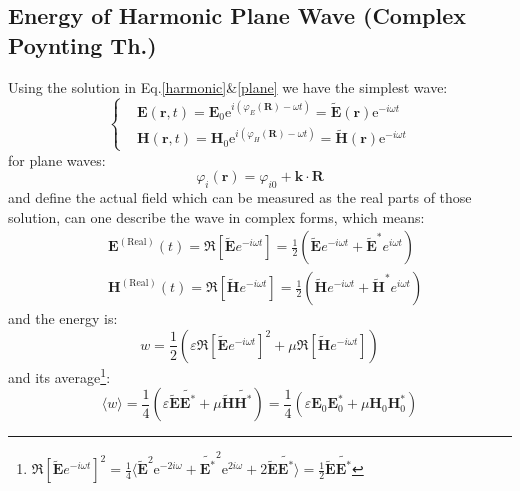\documentclass[11pt,a4paper,oneside]{book}
\begin{document}
\subsection{Energy of Harmonic Plane Wave (Complex Poynting Th.)}
Using the solution in Eq.\ref{harmonic}\&\ref{plane} we have the simplest wave:
\begin{equation}
	\left\{\begin{aligned}
		&\mathbf{E}(\mathbf{r},t)=\mathbf{E}_0\text{e}^{i(\varphi_E(\mathbf{R})-\omega t)}=\tilde{\mathbf{E}}(\mathbf{r})\text{e}^{-i\omega t} \\
		&\mathbf{H}(\mathbf{r},t)=\mathbf{H}_0\text{e}^{i(\varphi_H(\mathbf{R})-\omega t)}=\tilde{\mathbf{H}}(\mathbf{r})\text{e}^{-i\omega t} 
	\end{aligned}\right.
\end{equation}
for plane waves:\begin{equation}
	\varphi_i(\mathbf{r})=\varphi_{i0}+\mathbf{k}\cdot\mathbf{R}
\end{equation}
and define the actual field which can be measured as the real parts of those solution, can one describe the wave in complex forms, which means:\begin{equation}
	\begin{aligned}
		&\mathbf{E}^{(\text{Real})}(t) = \Re\left[\mathbf{\tilde{E}} e^{-i\omega t}\right] = \frac{1}{2} \left( \mathbf{\tilde{E}} e^{-i\omega t} + \mathbf{\tilde{E}}^* e^{i\omega t} \right)\\
		&\mathbf{H}^{(\text{Real})}(t) = \Re\left[\mathbf{\tilde{H}} e^{-i\omega t}\right] = \frac{1}{2} \left( \mathbf{\tilde{H}} e^{-i\omega t} + \mathbf{\tilde{H}}^* e^{i\omega t} \right)
	\end{aligned}
\end{equation}
and the energy is:\begin{equation}
	w=\frac{1}{2}\left(\varepsilon \Re\left[\mathbf{\tilde{E}} e^{-i\omega t}\right]^2+\mu\Re\left[\mathbf{\tilde{H}} e^{- i\omega t}\right]\right)
\end{equation}
and its average\footnote{$\Re\left[\mathbf{\tilde{E}} e^{-i\omega t}\right]^2=\frac{1}{4}\langle \mathbf{\tilde{E}}^2 \text{e}^{-2i\omega } + \mathbf{\tilde{E^*}}^2 \text{e}^{2i\omega} +2\mathbf{\tilde{E}}\mathbf{\tilde{E^*}} \rangle = \frac{1}{2}\mathbf{\tilde{E}}\mathbf{\tilde{E^*}}$}:\begin{equation}
	\langle w\rangle = \frac{1}{4}\left( \varepsilon\mathbf{\tilde{E}}\mathbf{\tilde{E^*}} +\mu\mathbf{\tilde{H}}\mathbf{\tilde{H^*}}\right)=\frac{1}{4}\left( \varepsilon\mathbf{{E}}_0\mathbf{{E}}^*_0 +\mu\mathbf{{H}}_0\mathbf{{H}}^*_0\right)
\end{equation}
\end{document}

